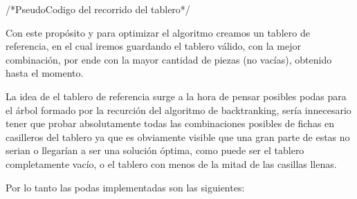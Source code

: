 /*PseudoCodigo del recorrido del tablero*/

Con este prop\'osito y para optimizar el algoritmo creamos un tablero de referencia, en el cual iremos guardando el tablero v\'alido, con la mejor combinaci\'on, por ende con la mayor cantidad de piezas (no vac\'ias), obtenido hasta el momento.

La idea de el tablero de referencia surge a la hora de pensar posibles podas para el \'arbol formado por la recurci\'on del algoritmo de backtranking, ser\'ia innecesario tener que probar absolutamente todas las combinaciones posibles de fichas en casilleros del tablero ya que es obviamente visible que una gran parte de estas no serian o llegar\'ian a ser una soluci\'on \'optima, como puede ser el tablero completamente vac\'io, o el tablero con menos de la mitad de las casillas llenas.

Por lo tanto las podas implementadas son las siguientes:

